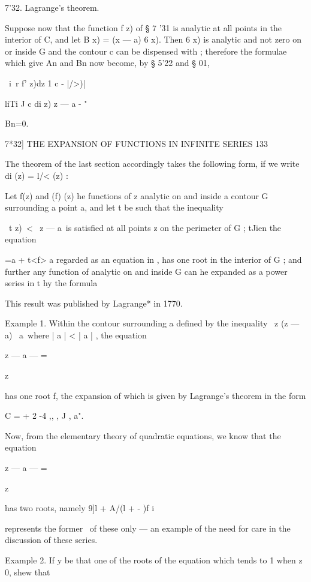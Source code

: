 7'32. Lagrange's theorem. 

Suppose now that the function f z) of § 7 '31 is analytic at all points in 
the interior of C, and let B  x) = (x — a) 6   x). Then 6   x) is analytic and 
not zero on or inside G and the contour c can be dispensed with ; therefore 
the formulae which give An and Bn now become, by § 5'22 and § 01, 

\ i\ r f' z)dz  1 c -  |/>)| 

liTi J c di z) z — a -   " 

Bn=0. 



7*32] THE EXPANSION OF FUNCTIONS IN INFINITE SERIES 133 

The theorem of the last section accordingly takes the following form, if 
we write di (z) = l/<  (z) : 

Let f(z) and (f) (z) he functions of z analytic on and inside a contour G 
surrounding a point a, and let t be such that the inequality 

\ t  z)\ <  \ z — a\ 
is satisfied at all points z on the perimeter of G ; tJien the equation 

 =a + t<f> a 
regarded as an equation in  , has one root in the interior of G ; and further 
any function of   analytic on and inside G can he expanded as a power series 
in t hy the formula 

This result was published by Lagrange* in 1770. 

Example 1. Within the contour surrounding a defined by the inequality \ z (z — a) \ a\, 
where | a | <   | a | , the equation 

z — a — = 

z 

has one root f, the expansion of which is given by Lagrange's theorem in the form 

C =  + 2  -4 ,, , J , a". 

Now, from the elementary theory of quadratic equations, we know that the equation 

z — a — = 

z 

has two roots, namely 9]l + A/(l + - )f  i  %

represents the former \ of these only — an example of the need for care in the discussion of 
these series. 

Example 2. If y be that one of the roots of the equation 
which tends to 1 when z~ 0, shew that 



